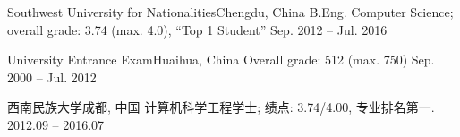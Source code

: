 

 {
    \resumeSubheading
      {Southwest University for Nationalities}{Chengdu, China}
      {B.Eng. Computer Science; overall grade: 3.74 (max. 4.0), ``Top 1 Student''
      }{Sep. 2012 -- Jul. 2016}


    \resumeSubheading
      {University Entrance Exam}{Huaihua, China}
      {Overall grade: 512 (max. 750)
      }{Sep. 2000 -- Jul. 2012}
}{
  \resumeSubheading
    {西南民族大学}{成都, 中国}
    {计算机科学工程学士; 绩点: 3.74/4.00, 专业排名第一.
    }{2012.09 -- 2016.07}
}


